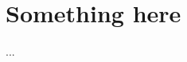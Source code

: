 \documentclass[journal]{IEEEtran}
\begin{document}
\section{Something here}

...

\ifCLASSOPTIONcaptionsoff
  \newpage
\fi



%
%
%









\end{document}
